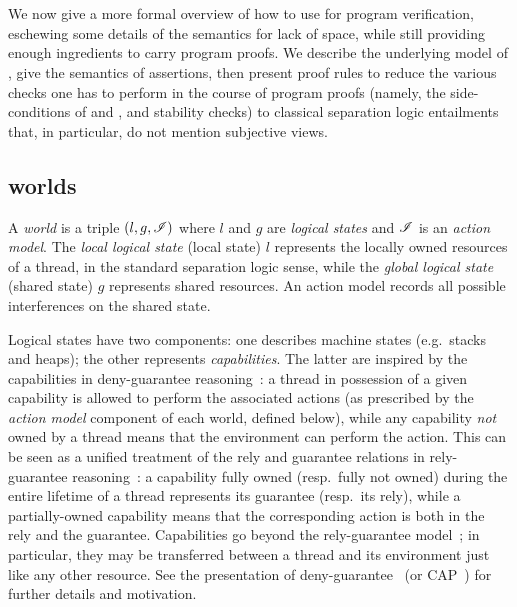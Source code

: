 \section{\colosl}\label{sec:colosl}
We now give a more formal overview of how to use \colosl for program
verification, eschewing some details of the semantics for lack of space,
while still providing enough ingredients to carry program proofs. We
describe the underlying model of \colosl, give the semantics of
\colosl assertions, then present proof rules to reduce the various
checks one has to perform in the course of \colosl program proofs
(namely, the side-conditions of \shiftRule and \extendRule, and
stability checks) to classical separation logic entailments that, in
particular, do not mention subjective views.


\subsection{\colosl worlds}
\label{subsec:model}

A \emph{world} is a triple $(l, g, \mathscr{I})$ where $l$ and $g$ are
\emph{logical states} and $\mathscr{I}$ is an \emph{action model}. The
\emph{local logical state} (local state) $l$ represents the
locally owned resources of a thread, in the standard separation logic
sense, while the \emph{global logical state} (shared state)
$g$ represents shared resources. An action model records all possible interferences on the shared state.

Logical states have two components: one describes machine states
(e.g.\ stacks and heaps); the other represents
\emph{capabilities}. The latter are inspired by the capabilities in
deny-guarantee reasoning~\cite{dg}: a thread in possession of a given
capability is allowed to perform the associated actions (as prescribed
by the \emph{action model} component of each world, defined below),
while any capability \emph{not} owned by a thread means that the
environment can perform the action. This can be seen as a unified
treatment of the rely and guarantee relations in rely-guarantee
reasoning~\cite{rg}: a capability fully owned (resp.\ fully not owned)
during the entire lifetime of a thread represents its guarantee
(resp.\ its rely), while a partially-owned capability means that the
corresponding action is both in the rely and the
guarantee. Capabilities go beyond the rely-guarantee model~\cite{dg};
in particular, they may be transferred between a thread and its
environment just like any other resource. See the presentation of
deny-guarantee~\cite{dg} (or CAP~\cite{cap-ecoop10}) for further details
and motivation.

